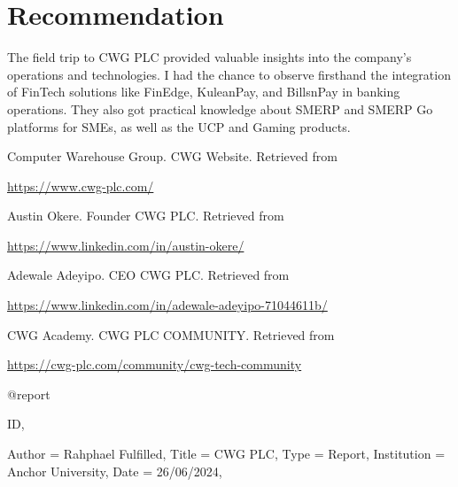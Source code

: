 \documentclass[a4paper,12pt]{report}
\begin{document}
	\section{Recommendation}
	The field trip to CWG PLC provided valuable insights into the company's operations and technologies. I had the chance to observe firsthand the integration of FinTech solutions like FinEdge, KuleanPay, and BillsnPay in banking operations. They also got practical knowledge about SMERP and SMERP Go platforms for SMEs, as well as the UCP and Gaming products.



	\begin{thebibliography}{9}
		Computer Warehouse Group. CWG Website. 
		Retrieved from 
		
		\url{https://www.cwg-plc.com/}
		
		Austin Okere. Founder CWG PLC. 
		Retrieved from 
		
		\url{https://www.linkedin.com/in/austin-okere/}
		
		
		Adewale Adeyipo. CEO CWG PLC. 
		Retrieved from 
		
		\url{https://www.linkedin.com/in/adewale-adeyipo-71044611b/}
		
		CWG Academy. CWG PLC COMMUNITY. 
		Retrieved from 
		
		\url{https://cwg-plc.com/community/cwg-tech-community}


@report{ID,

	Author = {Rahphael Fulfilled},
	Title = {CWG PLC},
	Type = {Report},
	Institution = {Anchor University},
	Date = {26/06/2024},

}

	\end{thebibliography}
	
\end{document}
